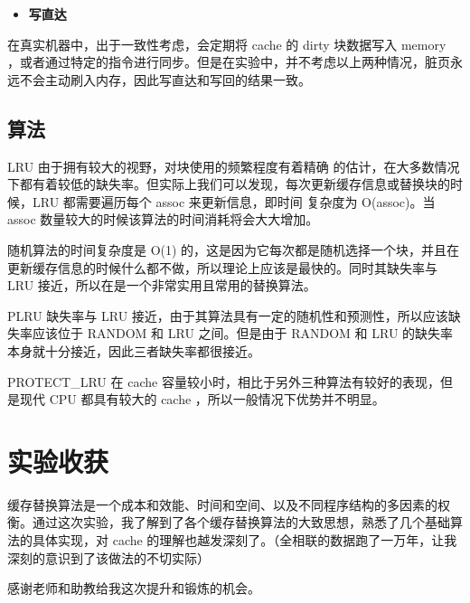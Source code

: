 \documentclass{article}
\begin{document}
\begin{itemize}
\item
\textbf{写直达}
\end{itemize}



在真实机器中，出于一致性考虑，会定期将 cache 的 dirty 块数据写入 memory ，或者通过特定的指令进行同步。但是在实验中，并不考虑以上两种情况，脏页永远不会主动刷入内存，因此写直达和写回的结果一致。


\subsection{算法}




LRU 由于拥有较大的视野，对块使用的频繁程度有着精确 的估计，在大多数情况下都有着较低的缺失率。但实际上我们可以发现，每次更新缓存信息或替换块的时候，LRU 都需要遍历每个 assoc 来更新信息，即时间 复杂度为 O(assoc)。当 assoc 数量较大的时候该算法的时间消耗将会大大增加。


随机算法的时间复杂度是 O(1) 的，这是因为它每次都是随机选择一个块，并且在更新缓存信息的时候什么都不做，所以理论上应该是最快的。同时其缺失率与 LRU 接近，所以在是一个非常实用且常用的替换算法。


PLRU 缺失率与 LRU 接近，由于其算法具有一定的随机性和预测性，所以应该缺失率应该位于 RANDOM 和 LRU 之间。但是由于 RANDOM 和 LRU 的缺失率本身就十分接近，因此三者缺失率都很接近。


PROTECT\_LRU 在 cache 容量较小时，相比于另外三种算法有较好的表现，但是现代 CPU 都具有较大的 cache ，所以一般情况下优势并不明显。


\section{实验收获}




缓存替换算法是一个成本和效能、时间和空间、以及不同程序结构的多因素的权衡。通过这次实验，我了解到了各个缓存替换算法的大致思想，熟悉了几个基础算法的具体实现，对 cache 的理解也越发深刻了。（全相联的数据跑了一万年，让我深刻的意识到了该做法的不切实际）


感谢老师和助教给我这次提升和锻炼的机会。
\end{document}
